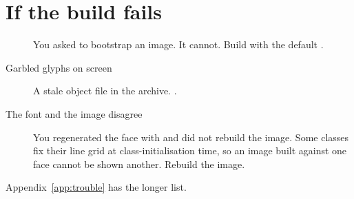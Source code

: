 \section{If the build fails}

\begin{description}
\item[] You asked  to
  bootstrap an image. It cannot. Build with the default .
\item[Garbled glyphs on screen] A stale object file in the archive. .
\item[The font and the image disagree] You regenerated the face with
   and did not rebuild the image. Some classes fix their line
  grid at class-initialisation time, so an image built against one face cannot
  be shown another. Rebuild the image.
\end{description}

Appendix~\ref{app:trouble} has the longer list.
